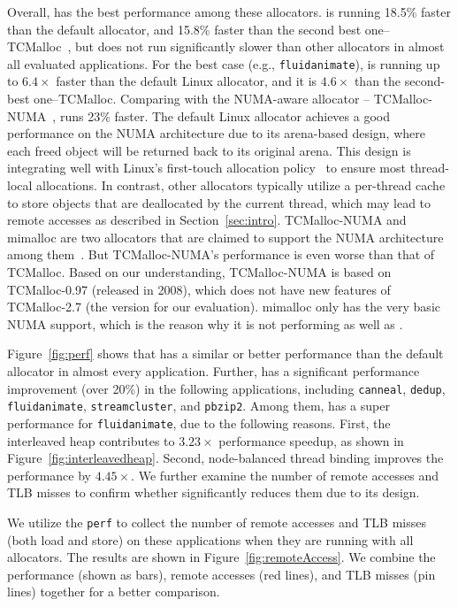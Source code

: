 Overall, \NM{} has the best performance among these allocators. \NM{} is running 18.5\% faster than the default allocator, and 15.8\% faster than the second best one--TCMalloc~\cite{tcmalloc}, but does not run significantly slower than other allocators in almost all evaluated applications. For the best case (e.g., \texttt{fluidanimate}), \NM{} is running up to $6.4\times$ faster than the default Linux allocator, and it is $4.6\times$ than the second-best one--TCMalloc.  Comparing with the NUMA-aware allocator -- TCMalloc-NUMA~\cite{tcmallocnew}, \NM{} runs 23\% faster. The default Linux allocator achieves a good performance on the NUMA architecture due to its arena-based design, where each freed object will be returned back to its original arena.
This design is integrating well with Linux's first-touch allocation policy~\cite{Lameter:2013:NO:2508834.2513149} to ensure most thread-local allocations. 
In contrast, other allocators typically utilize a per-thread cache to store objects that are deallocated by the current thread, which may lead to remote accesses as described in Section~\ref{sec:intro}.  TCMalloc-NUMA and mimalloc are two allocators that are claimed to support the NUMA architecture among them~\cite{tcmallocnew}. But TCMalloc-NUMA's performance is even worse than that of TCMalloc. Based on our understanding, TCMalloc-NUMA is based on TCMalloc-0.97 (released in 2008), which does not have new features of TCMalloc-2.7 (the version for our evaluation). mimalloc only has the very basic NUMA support, which is the reason why it is not performing as well as \NM{}.  


Figure~\ref{fig:perf} shows that \NM{} has a similar or better performance than the default allocator in almost every application. Further, \NM{} has a significant performance improvement (over 20\%) in the following applications, including \texttt{canneal}, \texttt{dedup}, \texttt{fluidanimate}, \texttt{streamcluster}, and \texttt{pbzip2}. Among them, \NM{} has a super performance for \texttt{fluidanimate}, due to the following reasons. First, the interleaved heap contributes to $3.23\times$ performance speedup, as shown in Figure~\ref{fig:interleavedheap}. Second, node-balanced thread binding improves the performance by $4.45\times$. We further examine the number of remote accesses and TLB misses to confirm whether \NM{} significantly reduces them due to its design. 

We utilize the \texttt{perf} to collect the number of remote accesses and TLB misses (both load and store) on these applications when they are running with all allocators. 
The results are shown in Figure~\ref{fig:remoteAccess}. We combine the performance (shown as bars), remote accesses (red lines), and TLB misses (pin lines) together for a better comparison.   

